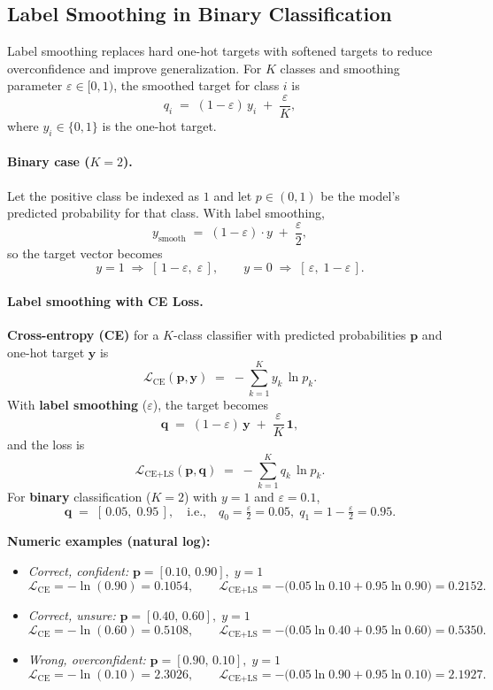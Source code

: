 \documentclass{article}
\begin{document}
\subsection{Label Smoothing in Binary Classification}
Label smoothing replaces hard one-hot targets with softened targets to reduce overconfidence and improve generalization. For $K$ classes and smoothing parameter $\varepsilon\in[0,1)$, the smoothed target for class $i$ is
\begin{equation}
\label{eq:ls-general}
q_i \;=\; (1-\varepsilon)\,y_i \;+\; \frac{\varepsilon}{K},
\end{equation}
where $y_i\in\{0,1\}$ is the one-hot target.

\paragraph{Binary case ($K{=}2$).}
Let the positive class be indexed as $1$ and let $p\in(0,1)$ be the model's predicted probability for that class. With label smoothing,
\[
y_{\text{smooth}} \;=\; (1-\varepsilon)\cdot y \;+\; \frac{\varepsilon}{2},
\]
so the target vector becomes
\[
y=1 \;\Rightarrow\; [\,1{-}\varepsilon,\;\varepsilon\,], 
\qquad
y=0 \;\Rightarrow\; [\,\varepsilon,\;1{-}\varepsilon\,].
\]

\paragraph{Label smoothing with CE Loss.}
\textbf{Cross-entropy (CE)} for a $K$-class classifier with predicted probabilities $\mathbf{p}$ and one-hot target $\mathbf{y}$ is
\[
\mathcal{L}_{\text{CE}}(\mathbf{p},\mathbf{y}) \;=\; -\sum_{k=1}^{K} y_k \,\ln p_k .
\]
With \textbf{label smoothing} ($\varepsilon$), the target becomes
\[
\mathbf{q} \;=\; (1-\varepsilon)\,\mathbf{y} \;+\; \frac{\varepsilon}{K}\,\mathbf{1},
\]
and the loss is
\[
\mathcal{L}_{\text{CE+LS}}(\mathbf{p},\mathbf{q}) \;=\; -\sum_{k=1}^{K} q_k \,\ln p_k .
\]
For \textbf{binary} classification ($K{=}2$) with $y{=}1$ and $\varepsilon{=}0.1$,
\[
\mathbf{q} \;=\; [\,0.05,\;0.95\,], \quad\text{i.e.,}\quad q_0=\tfrac{\varepsilon}{2}=0.05,\; q_1=1-\tfrac{\varepsilon}{2}=0.95.
\]

\smallskip
\noindent\textbf{Numeric examples (natural log):}
\begin{itemize}
  \item \emph{Correct, confident:} $\mathbf{p}=[0.10,\,0.90],\; y{=}1$
  \[
  \mathcal{L}_{\text{CE}}=-\ln(0.90)=\mathbf{0.1054},\qquad
  \mathcal{L}_{\text{CE+LS}}= -\big(0.05\ln 0.10 + 0.95\ln 0.90\big)=\mathbf{0.2152}.
  \]
  \item \emph{Correct, unsure:} $\mathbf{p}=[0.40,\,0.60],\; y{=}1$
  \[
  \mathcal{L}_{\text{CE}}=-\ln(0.60)=\mathbf{0.5108},\qquad
  \mathcal{L}_{\text{CE+LS}}= -\big(0.05\ln 0.40 + 0.95\ln 0.60\big)=\mathbf{0.5350}.
  \]
  \item \emph{Wrong, overconfident:} $\mathbf{p}=[0.90,\,0.10],\; y{=}1$
  \[
  \mathcal{L}_{\text{CE}}=-\ln(0.10)=\mathbf{2.3026},\qquad
  \mathcal{L}_{\text{CE+LS}}= -\big(0.05\ln 0.90 + 0.95\ln 0.10\big)=\mathbf{2.1927}.
  \]
\end{itemize}
\end{document}

